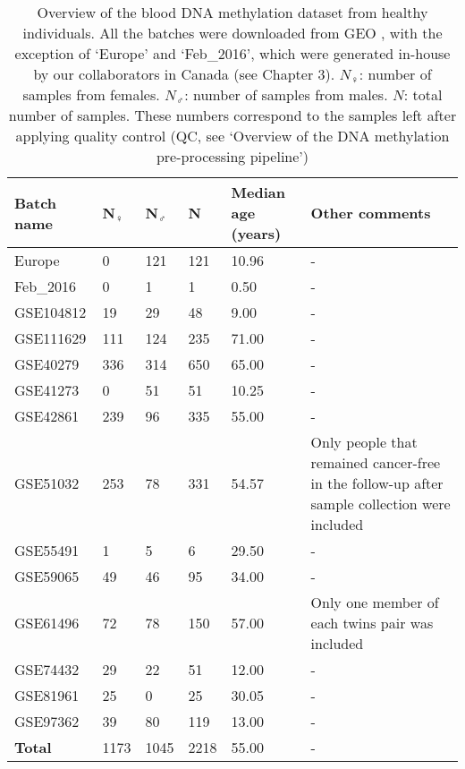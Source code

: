 \begin{table}
\small
	\begin{tabular}{ p{2cm} p{1cm} p{1cm} p{1cm} p{2cm} p{6cm} }
		\toprule
		\textbf{Batch name} & \textbf{N$_{\female}$} & \textbf{N$_{\male}$} & \textbf{N} & \textbf{Median age (years)} & \textbf{Other comments} \\
		\midrule
		Europe & 0 & 121 & 121 & 10.96 & - \\
		Feb\_2016 & 0 & 1 & 1 & 0.50 & - \\
		GSE104812 & 19 & 29 & 48 & 9.00 & - \\
		GSE111629 & 111 & 124 & 235 &  71.00 & - \\
		GSE40279 & 336 & 314 & 650 & 65.00 & - \\
		GSE41273 & 0 & 51 & 51 & 10.25 & - \\
		GSE42861 & 239 & 96 & 335 & 55.00 & - \\
		GSE51032 & 253 & 78 & 331 & 54.57 & Only people that remained cancer-free in the follow-up after sample collection were included  \\
		GSE55491 & 1 & 5 & 6 & 29.50 & - \\
		GSE59065 & 49 & 46 & 95 & 34.00 & - \\
		GSE61496 & 72 & 78 & 150 & 57.00 & Only one member of each twins pair was included \\
		GSE74432 & 29 & 22 & 51 & 12.00 & - \\
		GSE81961 & 25 & 0 & 25 & 30.05 & - \\
		GSE97362 & 39 & 80 & 119 & 13.00 & - \\
		\midrule
		\textbf{Total} & 1173 & 1045 & 2218 & 55.00 & - \\ 
		\bottomrule
	\end{tabular}
	\vspace*{3mm}
	\caption[Overview of the blood DNA methylation dataset from healthy individuals]{Overview of the blood DNA methylation dataset from healthy individuals. All the batches were downloaded from GEO \cite{Edgar2002}, with the exception of `Europe' and `Feb\_2016', which were generated in-house by our collaborators in Canada (see Chapter 3). $N_{\female}$: number of samples from females. $N_{\male}$: number of samples from males. $N$: total number of samples. These numbers correspond to the samples left after applying quality control (QC, see `Overview of the DNA methylation pre-processing pipeline')}
	\label{table:c2_table1}
\end{table} 


